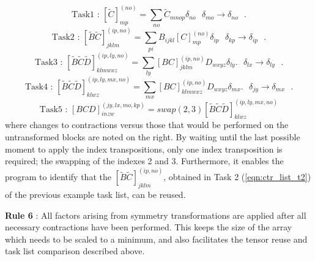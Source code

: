 \begin{equation*}
\text{Task1 \ : \ \ }
[\tilde{C}]^{(no)}_{mp} = \sum_{no} \tilde{C}_{mnop}\delta_{no}   \text{ \ \ \ $\delta_{mo} \rightarrow \delta_{no}$ }.
\end{equation*}
\begin{equation*}
\text{Task2 \ : \ \ }
[\tilde{B}\tilde{C}]^{(ip,no)}_{jklm} = \sum_{pi} B_{ijkl}[C]_{mp}^{(no)}\delta_{ip} 
\text{ \ \ \ $\delta_{kp} \rightarrow \delta_{ip}$ }.
\end{equation*}
\begin{equation*}
\text{Task3 \ : \ \ }
[\tilde{B}\tilde{C}\tilde{D}]^{(ip,ly,no)}_{klmwxz} = \sum_{ly} [BC]^{(ip,no)}_{jklm} D_{wxyz}\delta_{ly}. 
\text{ \ \ \ $\delta_{lx} \rightarrow \delta_{ly}$ }.
\end{equation*}
\begin{equation*}
\text{Task4 \ : \ \ }
[\tilde{B}\tilde{C}\tilde{D}]^{(ip,ly,mx,no)}_{klwz} = \sum_{mx} [BC]^{(ip,no)}_{klmwxz} D_{wxyz}\delta_{mx}.
\text{ \ \ \ $\delta_{jy} \rightarrow \delta_{mx}$ }.
\end{equation*}
\begin{equation*}
\text{Task5 \ : \ \ }
[BCD]^{(jy,lx,mo,kp)}_{inzw} = swap(2,3) [\tilde{B}\tilde{C}\tilde{D}]^{(ip,ly,mx,no)}_{klwz}
\end{equation*}
where changes to contractions versus those that would be performed on the
untransformed blocks are noted on the right. By waiting until the last
possible moment to apply the index transpositions,
only one index transposition is required; the swapping of the indexes 2 and 3.
Furthermore, it enables the program to identify that the $[\tilde{B}\tilde{C}]^{(ip,no)}_{jklm}$,
obtained in Task 2 (\ref{eqn:ctr_list_t2}) of the previous example task list, can be reused. 
 
\noindent \textbf{Rule 6} : All factors
arising from symmetry transformations are applied after all necessary
contractions have been performed. This keeps the size of the array which needs
to be scaled to a minimum, and also facilitates the tensor reuse and task list comparison described above.
